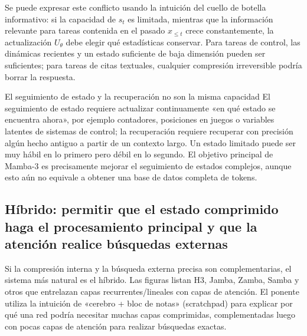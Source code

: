
Se puede expresar este conflicto usando la intuición del cuello de botella informativo: si la capacidad de $s_t$ es limitada, mientras que la información relevante para tareas contenida en el pasado $x_{\le t}$ crece constantemente, la actualización $U_\theta$ debe elegir qué estadísticas conservar. Para tareas de control, las dinámicas recientes y un estado suficiente de baja dimensión pueden ser suficientes; para tareas de citas textuales, cualquier compresión irreversible podría borrar la respuesta.

\begin{knowledgebox}{El seguimiento de estado y la recuperación no son la misma capacidad}
El seguimiento de estado requiere actualizar continuamente «en qué estado se encuentra ahora», por ejemplo contadores, posiciones en juegos o variables latentes de sistemas de control; la recuperación requiere recuperar con precisión algún hecho antiguo a partir de un contexto largo. Un estado limitado puede ser muy hábil en lo primero pero débil en lo segundo. El objetivo principal de Mamba-3 es precisamente mejorar el seguimiento de estados complejos, aunque esto aún no equivale a obtener una base de datos completa de tokens.
\end{knowledgebox}

\subsection{Híbrido: permitir que el estado comprimido haga el procesamiento principal y que la atención realice búsquedas externas}

Si la compresión interna y la búsqueda externa precisa son complementarias, el sistema más natural es el híbrido. Las figuras listan H3, Jamba, Zamba, Samba y otros que entrelazan capas recurrentes/lineales con capas de atención. El ponente utiliza la intuición de «cerebro + bloc de notas» (scratchpad) para explicar por qué una red podría necesitar muchas capas comprimidas, complementadas luego con pocas capas de atención para realizar búsquedas exactas.


